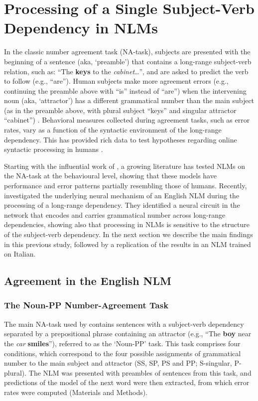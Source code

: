 \section{Processing of a Single Subject-Verb Dependency in NLMs}
In the classic number agreement task (NA-task), subjects are presented with the beginning of a sentence (aka, `preamble') that contains a long-range subject-verb relation, such as: ``The \textbf{keys} to the \emph{cabinet}\ldots'', and are asked to predict the verb to follow (e.g., ``are''). 
Human subjects make more agreement errors (e.g., continuing the preamble  above with ``is'' instead of ``are'') when the intervening noun (aka, `attractor') has a different grammatical number than the main subject (as in the preamble above, with plural subject ``keys'' and singular attractor ``cabinet'') \citep{Bock:Miller:1991}.
Behavioral measures collected during agreement tasks, such as error rates, vary as a function of the syntactic environment of the long-range dependency. This has provided rich data to test hypotheses regarding online syntactic processing in humans \citep[e.g., ][]{franck2002subject, franck2006agreement, franck2007syntactic}.

Starting with the influential work of \citet{Linzen:etal:2016}, a growing
literature \citep[e.g.,][]{Gulordava:etal:2018, Bernardy:Lappin:2017,
  Giulianelli:etal:2018, Kuncoro:etal:2018a,Linzen:Leonard:2018,jumelet2019analysing} has
tested NLMs on the NA-task at the behavioural level, showing that these models have performance and error patterns partially resembling those of humans.
Recently, \citet{lakretz2019emergence} investigated the underlying neural mechanism of an English NLM during the processing of a long-range dependency. They identified a neural circuit in the network that encodes and carries grammatical number across long-range dependencies, showing also that processing in NLMs is sensitive to the structure of the subject-verb dependency. 
In the next section we describe the main findings in this previous study, followed by a replication of the results in an NLM trained on Italian. 

\subsection{Agreement in the English NLM}

\subsubsection{The Noun-PP Number-Agreement Task}
The main NA-task used by \citet{lakretz2019emergence} contains sentences with a subject-verb dependency separated by a prepositional phrase containing an attractor (e.g., ``The \textbf{boy} near the \emph{car} \textbf{smiles}''), referred to as the `Noun-PP' task. This task comprises four conditions, which correspond to the four possible assignments of grammatical number to the main subject and attractor (SS, SP, PS and PP; S-singular, P-plural). The NLM was presented with preambles of sentences from this task, and predictions of the model of the next word were then extracted, from which error rates were computed (Materials and Methods). 

